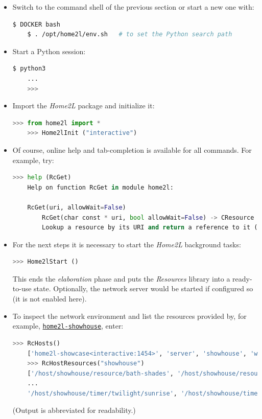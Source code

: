 \documentclass[12pt,english,parskip=half,headheight=19pt]{scrreprt}
\newcommand{\idx}[1]{#1\index{#1}}
\newcommand{\reftool}[1]{\hyperref[tool:#1]{\texttt{\idx{#1}}}}
\begin{document}
\begin{itemize}[$\blacktriangleright$]

\item
  Switch to the command shell of the previous section or start a new one with:
  \begin{lstlisting}[language=bash]
    $ DOCKER bash
    $ . /opt/home2l/env.sh   # to set the Python search path
  \end{lstlisting}

\item
  Start a Python session:
  \begin{lstlisting}[language=bash]
    $ python3
    ...
    >>>
  \end{lstlisting}

\item
  Import the \textit{Home2L} package and initialize it:
  \begin{lstlisting}[language=python]
    >>> from home2l import *
    >>> Home2lInit ("interactive")
  \end{lstlisting}

\item
  Of course, online help and tab-completion is available for all commands. For example, try:
  \begin{lstlisting}[language=python]
    >>> help (RcGet)
    Help on function RcGet in module home2l:

    RcGet(uri, allowWait=False)
        RcGet(char const * uri, bool allowWait=False) -> CResource
        Lookup a resource by its URI and return a reference to it (shortcut for 'RcGetResource()').
  \end{lstlisting}

\item
  For the next steps it is necessary to start the \textit{Home2L} background tasks:
  \begin{lstlisting}[language=python]
    >>> Home2lStart ()
  \end{lstlisting}
  This ends the \textit{elaboration} phase and puts the \textit{Resources} library into a ready-to-use state.
  Optionally, the network server would be started if configured so (it is not enabled here).

\item
  To inspect the network environment and list the resources provided by, for example,
  \reftool{home2l-showhouse}, enter:
  \begin{lstlisting}[language=python]
    >>> RcHosts()
    ['home2l-showcase<interactive:1454>', 'server', 'showhouse', 'wallclock']
    >>> RcHostResources("showhouse")
    ['/host/showhouse/resource/bath-shades', '/host/showhouse/resource/bath-window',
    ...
    '/host/showhouse/timer/twilight/sunrise', '/host/showhouse/timer/twilight/sunset']
  \end{lstlisting}
  (Output is abbreviated for readability.)
\end{itemize}
\end{document}
